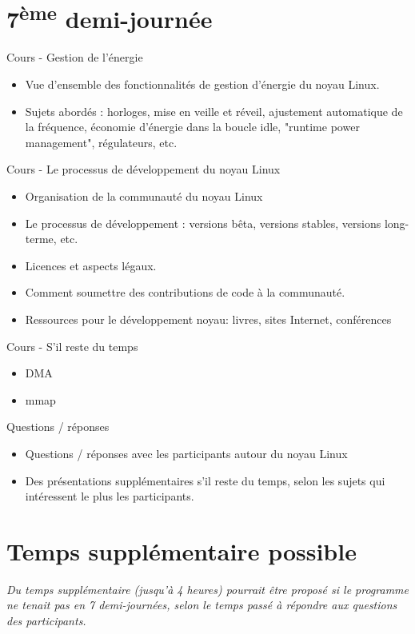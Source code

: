 \documentclass[a4paper,12pt,obeyspaces,spaces,hyphens]{article}
\begin{document}
\section{7\textsuperscript{ème} demi-journée}

\feagendaonecolumn
{Cours - Gestion de l'énergie}
{
  \begin{itemize}
  \item Vue d'ensemble des fonctionnalités de gestion d'énergie du noyau
    Linux.
  \item Sujets abordés : horloges, mise en veille et réveil, ajustement
    automatique de la fréquence, économie d'énergie dans la boucle idle,
    "runtime power management", régulateurs, etc.
  \end{itemize}
}

\feagendaonecolumn
{Cours - Le processus de développement du noyau Linux}
{
  \begin{itemize}
  \item Organisation de la communauté du noyau Linux
  \item Le processus de développement : versions bêta, versions stables,
    versions long-terme, etc.
  \item Licences et aspects légaux.
  \item Comment soumettre des contributions de code à la communauté.
  \item Ressources pour le développement noyau: livres, sites Internet, conférences
  \end{itemize}
}

\newpage

\feagendatwocolumn
{Cours - S'il reste du temps}
{
  \begin{itemize}
  \item DMA
  \item mmap
  \end{itemize}
}
{Questions / réponses}
{
  \begin{itemize}
  \item Questions / réponses avec les participants autour du noyau Linux
  \item Des présentations supplémentaires s'il reste du temps, selon les sujets
	qui intéressent le plus les participants.
  \end{itemize}
}

\section{Temps supplémentaire possible}

{\em Du temps supplémentaire (jusqu'à 4 heures) pourrait être proposé si le programme ne tenait
     pas en 7 demi-journées, selon le temps passé à répondre aux questions des participants.}
\end{document}
